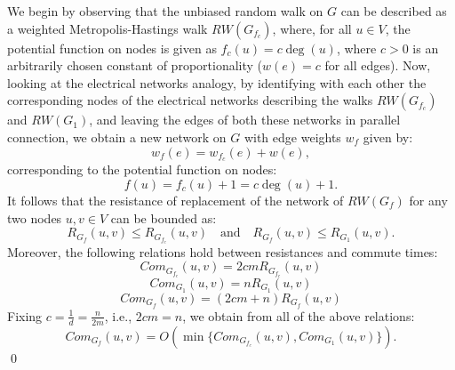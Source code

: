 \documentclass[11pt,a4paper]{article}
\renewcommand{\*}{\hspace*{5mm}}
\begin{document}
We begin by observing that the unbiased random walk on $G$ can be described as a weighted Metropolis-Hastings walk $RW(G_{f_c})$, where, for all $u\in V$, the potential function on nodes is given as $f_c(u) = c\deg(u)$, where $c>0$ is an arbitrarily chosen constant of proportionality ($w(e) = c$ for all edges). Now, looking at the electrical networks analogy, by identifying with each other the corresponding nodes of the electrical networks describing the walks $RW(G_{f_c})$ and $RW(G_1)$, and leaving the edges of both these networks in parallel connection, we obtain a new network on $G$ with edge weights $w_f$ given by:
$$
w_f(e) = w_{f_c}(e) + w(e),
$$
corresponding to the potential function on nodes:
$$
f(u) = f_c(u) + 1 = c\deg(u) + 1.
$$
It follows that the resistance of replacement of the network of $RW(G_f)$ for any two nodes $u,v\in V$ can be bounded as:
$$
R_{G_f}(u,v) \leq R_{G_{f_c}}(u,v) \quad \text{and} \quad R_{G_f}(u,v) \leq R_{G_1}(u,v).
$$
Moreover, the following relations hold between resistances and commute times:
$$
Com_{G_{f_c}}(u,v) = 2cm R_{G_{f_c}}(u,v)
$$
$$
Com_{G_1}(u,v) = n R_{G_1}(u,v)
$$
$$
Com_{G_{f}}(u,v) = (2cm + n) R_{G_f}(u,v)
$$
Fixing $c = \frac{1}{d} = \frac{n}{2m}$, i.e., $2cm = n$, we obtain from all of the above relations:
\begin{equation}\label{eqXA}
Com_{G_f}(u,v) = O(\min\{Com_{G_{f_c}}(u,v),Com_{G_1}(u,v)\}).
\end{equation}
\qed
\end{document}
